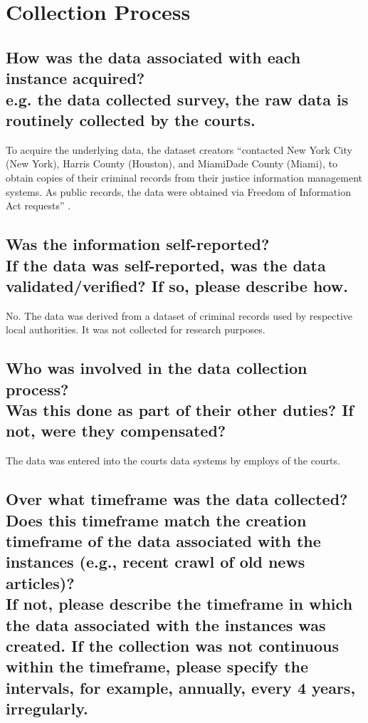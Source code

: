 \documentclass[letterpaper, 10 pt, conference]{ieeeconf}  %
\newcommand{\subtitle}[1]{{\\ \small \normalfont \color{purple} #1}}
\begin{document}
\section{Collection Process}

\subsection{How was the data associated with each instance acquired? \subtitle {e.g. the data collected survey, the raw data is routinely collected by the courts.}}

To acquire the underlying data, the dataset creators ``contacted New York
City (New York), Harris County (Houston), and MiamiDade County (Miami), to obtain copies of their criminal records from their justice information management systems. As public records, the data were obtained via Freedom of Information Act requests'' \cite{ormachea2015new}.

\subsection{Was the information self-reported? \subtitle{If the data was self-reported, was the data validated/verified? If so, please describe how.}}

No. The data was derived from a dataset of criminal records used by respective local authorities. It was not collected for research purposes. 


\subsection{Who was involved in the data collection process? \subtitle{Was this done as part of their other duties? If not, were they compensated?}}

The data was entered into the courts data systems by employs of the courts. 

\subsection{Over what timeframe was the data collected? Does this timeframe match the creation timeframe of the data associated with the instances (e.g., recent crawl of old news articles)? \subtitle{If not, please describe the timeframe in which the data associated with the instances was created. If the collection was not continuous within the timeframe, please specify the intervals, for example, annually, every 4 years, irregularly.}}
\end{document}
